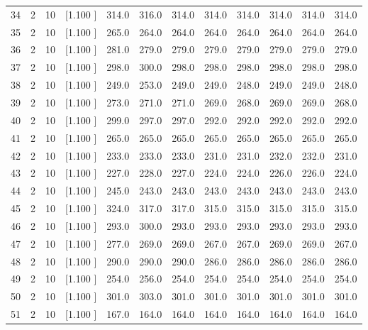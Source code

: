 \documentclass[12pt,a4paper]{article}
\begin{document}
\begin{center}
{\begin{tabular}{r r r r r r r r r r r r}
  34&  2& 10&[1.100     ]&   314.0&   316.0&   314.0&   314.0&   314.0&   314.0&   314.0&   314.0\\[-0.02in]
  35&  2& 10&[1.100     ]&   265.0&   264.0&   264.0&   264.0&   264.0&   264.0&   264.0&   264.0\\[-0.02in]
  36&  2& 10&[1.100     ]&   281.0&   279.0&   279.0&   279.0&   279.0&   279.0&   279.0&   279.0\\[-0.02in]
  37&  2& 10&[1.100     ]&   298.0&   300.0&   298.0&   298.0&   298.0&   298.0&   298.0&   298.0\\[-0.02in]
  38&  2& 10&[1.100     ]&   249.0&   253.0&   249.0&   249.0&   248.0&   249.0&   249.0&   248.0\\[-0.02in]
  39&  2& 10&[1.100     ]&   273.0&   271.0&   271.0&   269.0&   268.0&   269.0&   269.0&   268.0\\[-0.02in]
  40&  2& 10&[1.100     ]&   299.0&   297.0&   297.0&   292.0&   292.0&   292.0&   292.0&   292.0\\[-0.02in]
  41&  2& 10&[1.100     ]&   265.0&   265.0&   265.0&   265.0&   265.0&   265.0&   265.0&   265.0\\[-0.02in]
  42&  2& 10&[1.100     ]&   233.0&   233.0&   233.0&   231.0&   231.0&   232.0&   232.0&   231.0\\[-0.02in]
  43&  2& 10&[1.100     ]&   227.0&   228.0&   227.0&   224.0&   224.0&   226.0&   226.0&   224.0\\[-0.02in]
  44&  2& 10&[1.100     ]&   245.0&   243.0&   243.0&   243.0&   243.0&   243.0&   243.0&   243.0\\[-0.02in]
  45&  2& 10&[1.100     ]&   324.0&   317.0&   317.0&   315.0&   315.0&   315.0&   315.0&   315.0\\[-0.02in]
  46&  2& 10&[1.100     ]&   293.0&   300.0&   293.0&   293.0&   293.0&   293.0&   293.0&   293.0\\[-0.02in]
  47&  2& 10&[1.100     ]&   277.0&   269.0&   269.0&   267.0&   267.0&   269.0&   269.0&   267.0\\[-0.02in]
  48&  2& 10&[1.100     ]&   290.0&   290.0&   290.0&   286.0&   286.0&   286.0&   286.0&   286.0\\[-0.02in]
  49&  2& 10&[1.100     ]&   254.0&   256.0&   254.0&   254.0&   254.0&   254.0&   254.0&   254.0\\[-0.02in]
  50&  2& 10&[1.100     ]&   301.0&   303.0&   301.0&   301.0&   301.0&   301.0&   301.0&   301.0\\[-0.02in]
  51&  2& 10&[1.100     ]&   167.0&   164.0&   164.0&   164.0&   164.0&   164.0&   164.0&   164.0\\[-0.02in]

\end{tabular}}
\end{center}
\end{document}
